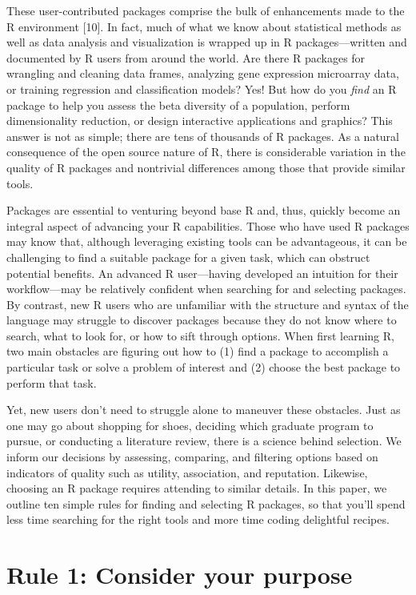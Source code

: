 \documentclass[10pt,letterpaper]{article}
\begin{document}
These user-contributed packages comprise the bulk of enhancements made
to the R environment {[}10{]}. In fact, much of what we know about
statistical methods as well as data analysis and visualization is
wrapped up in R packages---written and documented by R users from around
the world. Are there R packages for wrangling and cleaning data frames,
analyzing gene expression microarray data, or training regression and
classification models? Yes! But how do you \emph{find} an R package to
help you assess the beta diversity of a population, perform
dimensionality reduction, or design interactive applications and
graphics? This answer is not as simple; there are tens of thousands of R
packages. As a natural consequence of the open source nature of R, there
is considerable variation in the quality of R packages and nontrivial
differences among those that provide similar tools.

Packages are essential to venturing beyond base R and, thus, quickly
become an integral aspect of advancing your R capabilities. Those who
have used R packages may know that, although leveraging existing tools
can be advantageous, it can be challenging to find a suitable package
for a given task, which can obstruct potential benefits. An advanced R
user---having developed an intuition for their workflow---may be
relatively confident when searching for and selecting packages. By
contrast, new R users who are unfamiliar with the structure and syntax
of the language may struggle to discover packages because they do not
know where to search, what to look for, or how to sift through options.
When first learning R, two main obstacles are figuring out how to (1)
find a package to accomplish a particular task or solve a problem of
interest and (2) choose the best package to perform that task.

Yet, new users don't need to struggle alone to maneuver these obstacles.
Just as one may go about shopping for shoes, deciding which graduate
program to pursue, or conducting a literature review, there is a science
behind selection. We inform our decisions by assessing, comparing, and
filtering options based on indicators of quality such as utility,
association, and reputation. Likewise, choosing an R package requires
attending to similar details. In this paper, we outline ten simple rules
for finding and selecting R packages, so that you'll spend less time
searching for the right tools and more time coding delightful recipes.

\hypertarget{rule-1-consider-your-purpose}{%
\section{Rule 1: Consider your
purpose}\label{rule-1-consider-your-purpose}}
\end{document}
